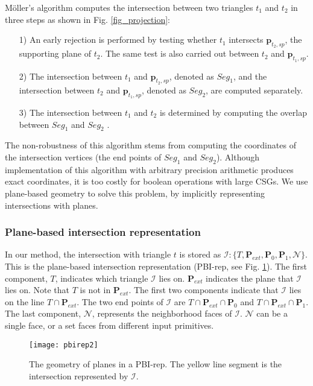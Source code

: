 M\"{o}ller's algorithm computes the intersection between two triangles $t_1$ and $t_2$ in three steps as shown in Fig. \ref{fig_projection}:
\begin{itemize}[leftmargin=0.45cm]
\item[1)] An early rejection is performed by testing whether $t_1$ intersects $\bm{p}_{t_2, sp}$, the supporting plane of $t_2$. The same test is also carried out between $t_2$ and $\bm{p}_{t_1, sp}$.
\item[2)]The intersection between $t_1$ and $\bm{p}_{t_2, sp}$, denoted as $Seg_1$, and the intersection between $t_2$ and $\bm{p}_{t_1, sp}$, denoted as $Seg_2$, are computed separately.
 \item[3)]The intersection between $t_1$ and $t_2$ is determined by computing the overlap between $Seg_1$ and $Seg_2$ .
\end{itemize}



The non-robustness of this algorithm stems from computing the coordinates of the intersection vertices (the end points of $Seg_1$ and $Seg_2$). Although implementation of this algorithm with arbitrary precision arithmetic produces exact coordinates, it is too costly for boolean operations with large CSGs. We use plane-based geometry to solve this problem, by implicitly representing intersections with planes.

\subsubsection{Plane-based intersection representation}
\label{sec:ir}

In our method, the intersection with triangle $t$ is stored as $\bm{\mathcal{I}}\colon\{T, \bm{P}_{ext}, \bm{P}_0, \bm{P}_1, \mathcal{N}\}$. This is the plane-based intersection representation (PBI-rep,  see Fig. \ref{fig:pbi}). The first component, $T$, indicates which triangle $\bm{\mathcal{I}}$ lies on.
$\bm{P}_{ext}$ indicates the plane that $\bm{\mathcal{I}}$ lies on. Note that $T$ is not in $\bm{P}_{ext}$. The first two components indicate that  $\bm{\mathcal{I}}$ lies on the line $T \cap \bm{P}_{ext}$.
The two end points of $\bm{\mathcal{I}}$ are $T \cap \bm{P}_{ext}\cap\bm{P}_0$ and $T \cap \bm{P}_{ext}\cap\bm{P}_1$.
The last component, $\mathcal{N}$, represents the neighborhood faces of $\bm{\mathcal{I}}$. $\mathcal{N}$ can be a single face, or a set faces from different input primitives.

\begin{figure}[t]
\centering
\texttt{[image: pbirep2]}
\caption{The geometry of planes in a PBI-rep. The yellow line segment is the intersection represented by $\bm{\mathcal{I}}$.}
\label{fig:pbi}
\end{figure}

